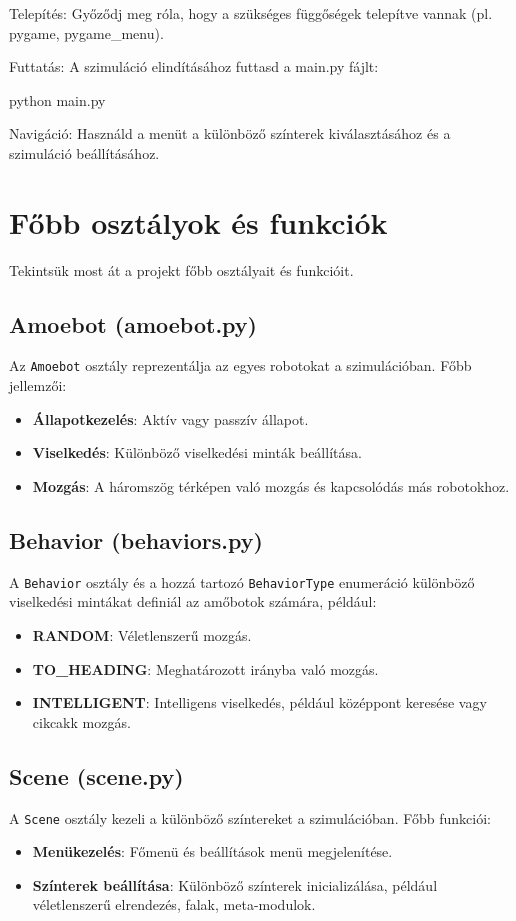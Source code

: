 \documentclass[	
  noindent
]{elteikthesis}[2024/04/26]
\begin{document}
      Telepítés: Győződj meg róla, hogy a szükséges függőségek telepítve vannak (pl. pygame, pygame_menu).
      
      Futtatás: A szimuláció elindításához futtasd a main.py fájlt:
      
      python main.py
      
      Navigáció: Használd a menüt a különböző színterek kiválasztásához és a szimuláció beállításához.
  
  \section*{Főbb osztályok és funkciók}
    Tekintsük most át a projekt főbb osztályait és funkcióit.

    \subsection*{Amoebot (amoebot.py)}
    Az \texttt{Amoebot} osztály reprezentálja az egyes robotokat a szimulációban. Főbb jellemzői:
    \begin{itemize}[left=0pt]
        \item \textbf{Állapotkezelés}: Aktív vagy passzív állapot.
        \item \textbf{Viselkedés}: Különböző viselkedési minták beállítása.
        \item \textbf{Mozgás}: A háromszög térképen való mozgás és kapcsolódás más robotokhoz.
    \end{itemize}
  
    \subsection*{Behavior (behaviors.py)}
    A \texttt{Behavior} osztály és a hozzá tartozó \texttt{BehaviorType} enumeráció különböző viselkedési mintákat definiál az amőbotok számára, például:
    \begin{itemize}[left=0pt]
        \item \textbf{RANDOM}: Véletlenszerű mozgás.
        \item \textbf{TO\_HEADING}: Meghatározott irányba való mozgás.
        \item \textbf{INTELLIGENT}: Intelligens viselkedés, például középpont keresése vagy cikcakk mozgás.
    \end{itemize}
  
    \subsection*{Scene (scene.py)}
    A \texttt{Scene} osztály kezeli a különböző színtereket a szimulációban. Főbb funkciói:
    \begin{itemize}[left=0pt]
        \item \textbf{Menükezelés}: Főmenü és beállítások menü megjelenítése.
        \item \textbf{Színterek beállítása}: Különböző színterek inicializálása, például véletlenszerű elrendezés, falak, meta-modulok.
    \end{itemize}
  
\end{document}
